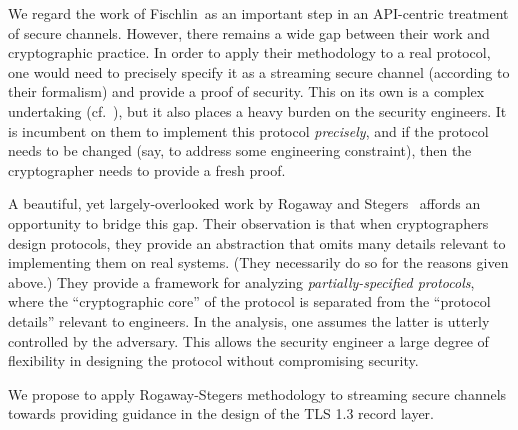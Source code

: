 {We regard the work of Fischlin~\etal as an
important step in an API-centric treatment of secure channels.
%
However, there remains a wide gap between their work and cryptographic practice.
In order to apply their methodology to a real protocol, one would need to
precisely specify it as a streaming secure channel (according to their
formalism) and provide a proof of security. This on its own is a complex
undertaking (cf.~\cite{DLFK+17}), but it also places a heavy burden on the
security engineers. It is incumbent on them to implement this protocol
\emph{precisely}, and if the protocol needs to be changed (say, to address some
engineering constraint), then the cryptographer needs to provide a fresh proof.

A beautiful, yet largely-overlooked work by Rogaway and Stegers~\cite{RS09}
affords an opportunity to bridge this gap. Their observation is that when
cryptographers design protocols, they provide an abstraction that omits many
details relevant to implementing them on real systems. (They necessarily do
so for the reasons given above.) 
%
They provide a framework for analyzing \emph{partially-specified protocols},
where the ``cryptographic core'' of the protocol is separated from the
``protocol details'' relevant to engineers. In the analysis, one assumes the
latter is utterly controlled by the adversary. This  allows the security
engineer a large degree of flexibility in designing the protocol without
compromising security.  

\begin{task}\label{task:sc}
  We propose to apply Rogaway-Stegers methodology to streaming secure channels
  towards providing guidance in the design of the TLS 1.3 record layer.
\end{task}


%

}
